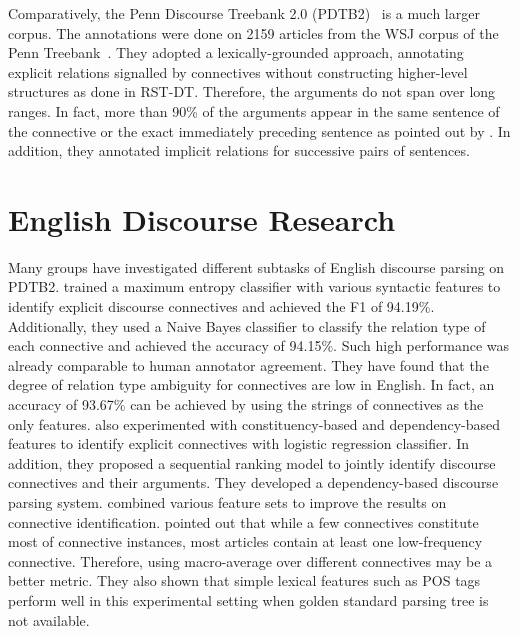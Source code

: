

Comparatively, the Penn Discourse Treebank 2.0 (PDTB2)~\citep{Prasad08thepenn}
is a much larger corpus. The annotations were done on 2159 articles from
the WSJ corpus of the Penn Treebank~\citep{marcus1993building}. They adopted a lexically-grounded
approach, annotating explicit relations signalled by connectives without constructing higher-level
structures as done in RST-DT. Therefore, the arguments do not span over long ranges. In fact,
more than 90\% of the arguments appear in the same sentence of the connective or the
exact immediately preceding sentence as pointed out by \cite{kong2014a}.
In addition, they annotated implicit relations for successive pairs of sentences.


\section{English Discourse Research}

Many groups have investigated different subtasks of English
discourse parsing on PDTB2. \cite{pitler2009using} trained a maximum
entropy classifier with various syntactic features to identify explicit discourse
connectives and achieved the F1 of 94.19\%. Additionally, they used
a Naive Bayes classifier to classify the relation type of each connective and
achieved the accuracy of 94.15\%. Such high performance was already comparable to human
annotator agreement. They have found that the degree of relation type ambiguity
for connectives are low in English. In fact, an accuracy of 93.67\% can be achieved
by using the strings of connectives as the only features. \cite{wellner2009sequence}
also experimented with constituency-based and dependency-based features to identify
explicit connectives with logistic regression classifier. In addition, they proposed
a sequential ranking model to jointly identify discourse connectives and their arguments.
They developed a dependency-based discourse parsing system. \cite{faiz2013identifying} combined
various feature sets to improve the results on connective identification. \cite{j2013disambig} pointed
out that while a few connectives constitute most of connective instances, most articles contain
at least one low-frequency connective. Therefore, using macro-average over different connectives
may be a better metric. They also shown that simple lexical features such as POS tags perform
well in this experimental setting when golden standard parsing tree is not available.

